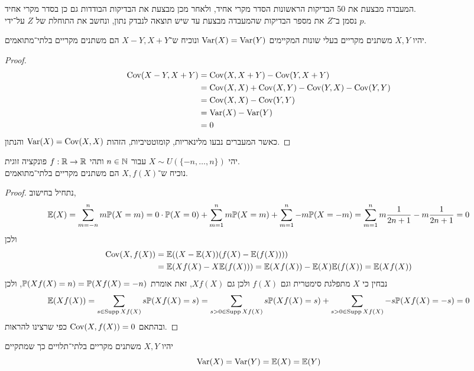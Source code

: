 \subquestion{}
המעבדה מבצעת את 50 הבדיקות הראשונות הסדר מקרי אחיד, ולאחר מכן מבצעת את הבדיקות הבודדות גם כן בסדר מקרי אחיד. \\
נסמן ב־$Z$ את מספר הבדיקות שהמעבדה מבצעת עד שיש תוצאה לנבדק נתון, ונחשב את התוחלת של $Z$ על־ידי $p$.
\begin{solution}
	
\end{solution}

\question{}
יהיו $X, Y$ משתנים מקריים בעלי שונות המקיימים $\operatorname{Var}(X) = \operatorname{Var}(Y)$ ונוכיח ש־$X - Y, X + Y$ הם משתנים מקריים בלתי־מתואמים.
\begin{proof}
	\begin{align*}
		\operatorname{Cov}(X - Y, X + Y)
		& = \operatorname{Cov}(X, X + Y) - \operatorname{Cov}(Y, X + Y) \\
		& = \operatorname{Cov}(X, X) + \operatorname{Cov}(X, Y) - \operatorname{Cov}(Y, X) - \operatorname{Cov}(Y, Y) \\
		& = \operatorname{Cov}(X, X) - \operatorname{Cov}(Y, Y) \\
		& = \operatorname{Var}(X) - \operatorname{Var}(Y) \\
		& = 0
	\end{align*}
	כאשר המעברים נבעו מלינאריות, קומוטטיביות, הזהות $\operatorname{Var}(X) = \operatorname{Cov}(X, X)$ והנתון.
\end{proof}

\question{}
יהי $X \sim U(\{-n, \dots, n\})$ עבור $n \in \mathbb{N}$ ותהי $f : \mathbb{R} \to \mathbb{R}$ פונקציה זוגית. \\
נוכיח ש־$X, f(X)$ הם משתנים מקריים בלתי־מתואמים.
\begin{proof}
	נתחיל בחישוב,
	\[
		\mathbb{E}(X)
		= \sum_{m = -n}^{n} m \mathbb{P}(X = m)
		= 0 \cdot \mathbb{P}(X = 0) + \sum_{m = 1}^{n} m \mathbb{P}(X = m) + \sum_{m = 1}^{n} -m \mathbb{P}(X = -m)
		= \sum_{m = 1}^{n} m \frac{1}{2n + 1} - m \frac{1}{2n + 1}
		= 0
	\]
	ולכן
	\begin{align*}
		\operatorname{Cov}(X, f(X))
		& = \mathbb{E}((X - \mathbb{E}(X))(f(X) - \mathbb{E}(f(X)))) \\
		& = \mathbb{E}(X f(X) - X \mathbb{E}(f(X)))
		= \mathbb{E}(X f(X)) - \mathbb{E}(X) \mathbb{E}(f(X))
		= \mathbb{E}(X f(X))
	\end{align*}
	נבחין כי $X$ מתפלגת סימטרית וגם $f(X)$ ולכן גם $X f(X)$, זאת אומרת $\mathbb{P}(X f(X) = n) = \mathbb{P}(X f(X) = -n)$, ולכן
	\[
		\mathbb{E}(X f(X))
		= \sum_{s \in \operatorname{Supp} X f(X)} s \mathbb{P}(X f(X) = s)
		= \sum_{s > 0 \in \operatorname{Supp} X f(X)} s \mathbb{P}(X f(X) = s)
		+ \sum_{s > 0 \in \operatorname{Supp} X f(X)} -s \mathbb{P}(X f(X) = -s)
		= 0
	\]
	ובהתאם $\operatorname{Cov}(X, f(X)) = 0$ כפי שרצינו להראות.
\end{proof}

\question{}
יהיו $X, Y$ משתנים מקריים בלתי־תלויים כך שמתקיים
\[
	\operatorname{Var}(X) = \operatorname{Var}(Y) = \mathbb{E}(X) = \mathbb{E}(Y)
\]

